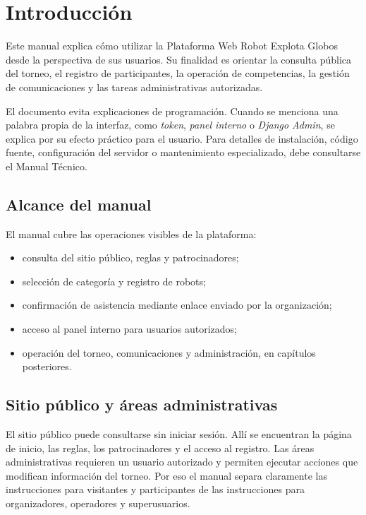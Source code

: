 \chapter*{Introducción}

Este manual explica cómo utilizar la Plataforma Web Robot Explota Globos desde la perspectiva de sus usuarios. Su finalidad es orientar la consulta pública del torneo, el registro de participantes, la operación de competencias, la gestión de comunicaciones y las tareas administrativas autorizadas.

El documento evita explicaciones de programación. Cuando se menciona una palabra propia de la interfaz, como \emph{token}, \emph{panel interno} o \emph{Django Admin}, se explica por su efecto práctico para el usuario. Para detalles de instalación, código fuente, configuración del servidor o mantenimiento especializado, debe consultarse el Manual Técnico.

\section*{Alcance del manual}

El manual cubre las operaciones visibles de la plataforma:
\begin{itemize}
    \item consulta del sitio público, reglas y patrocinadores;
    \item selección de categoría y registro de robots;
    \item confirmación de asistencia mediante enlace enviado por la organización;
    \item acceso al panel interno para usuarios autorizados;
    \item operación del torneo, comunicaciones y administración, en capítulos posteriores.
\end{itemize}

\section*{Sitio público y áreas administrativas}

El sitio público puede consultarse sin iniciar sesión. Allí se encuentran la página de inicio, las reglas, los patrocinadores y el acceso al registro. Las áreas administrativas requieren un usuario autorizado y permiten ejecutar acciones que modifican información del torneo. Por eso el manual separa claramente las instrucciones para visitantes y participantes de las instrucciones para organizadores, operadores y superusuarios.


